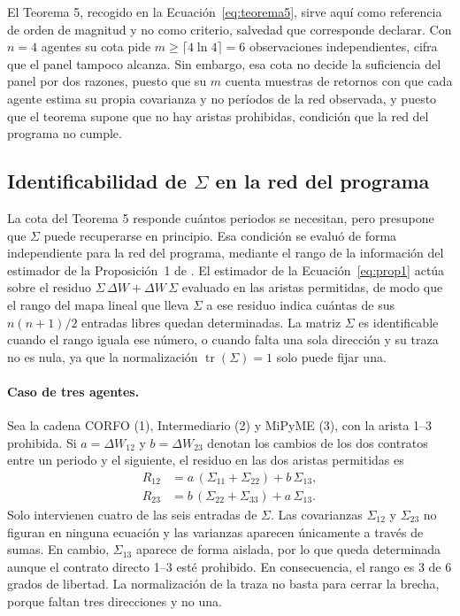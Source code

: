El Teorema 5, recogido en la Ecuación~\eqref{eq:teorema5}, sirve aquí como referencia de orden de magnitud y no como criterio, salvedad que corresponde declarar. Con $n=4$ agentes su cota pide $m \geq \lceil 4\ln 4\rceil = 6$ observaciones independientes, cifra que el panel tampoco alcanza. Sin embargo, esa cota no decide la suficiencia del panel por dos razones, puesto que su $m$ cuenta muestras de retornos con que cada agente estima su propia covarianza y no períodos de la red observada, y puesto que el teorema supone que no hay aristas prohibidas, condición que la red del programa no cumple.

\subsection[Identificabilidad de Sigma en la red del programa]{Identificabilidad de $\Sigma$ en la red del programa}
\label{c3:identificabilidad}

La cota del Teorema 5 responde cuántos periodos se necesitan, pero presupone que $\Sigma$ puede recuperarse en principio. Esa condición se evaluó de forma independiente para la red del programa, mediante el rango de la información del estimador de la Proposición~1 de . El estimador de la Ecuación~\eqref{eq:prop1} actúa sobre el residuo $\Sigma\,\Delta W + \Delta W\,\Sigma$ evaluado en las aristas permitidas, de modo que el rango del mapa lineal que lleva $\Sigma$ a ese residuo indica cuántas de sus $n(n+1)/2$ entradas libres quedan determinadas. La matriz $\Sigma$ es identificable cuando el rango iguala ese número, o cuando falta una sola dirección y su traza no es nula, ya que la normalización $\operatorname{tr}(\Sigma)=1$ solo puede fijar una.

\paragraph{Caso de tres agentes.}
Sea la cadena CORFO (1), Intermediario (2) y MiPyME (3), con la arista 1--3 prohibida. Si $a=\Delta W_{12}$ y $b=\Delta W_{23}$ denotan los cambios de los dos contratos entre un periodo y el siguiente, el residuo en las dos aristas permitidas es
\begin{equation}
\label{eq:residuo-cadena}
\begin{aligned}
R_{12} &= a\,(\Sigma_{11}+\Sigma_{22}) + b\,\Sigma_{13},\\
R_{23} &= b\,(\Sigma_{22}+\Sigma_{33}) + a\,\Sigma_{13}.
\end{aligned}
\end{equation}
Solo intervienen cuatro de las seis entradas de $\Sigma$. Las covarianzas $\Sigma_{12}$ y $\Sigma_{23}$ no figuran en ninguna ecuación y las varianzas aparecen únicamente a través de sumas. En cambio, $\Sigma_{13}$ aparece de forma aislada, por lo que queda determinada aunque el contrato directo 1--3 esté prohibido. En consecuencia, el rango es 3 de 6 grados de libertad. La normalización de la traza no basta para cerrar la brecha, porque faltan tres direcciones y no una.

